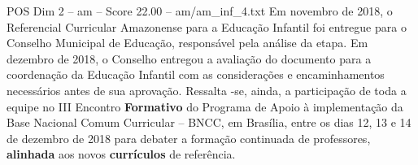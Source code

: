\begin{textsample}{POS Dim 2 – am – Score 22.00 – am/am\_inf\_4.txt}
Em novembro de 2018, o Referencial Curricular Amazonense para a Educação Infantil foi entregue para o Conselho Municipal de Educação, responsável pela análise da etapa.
Em dezembro de 2018, o Conselho entregou a avaliação do documento para a coordenação da Educação Infantil com as considerações e encaminhamentos necessários antes de sua aprovação.
Ressalta -se, ainda, a participação de toda a equipe no III Encontro \textbf{Formativo} do Programa de Apoio à implementação da Base Nacional Comum Curricular – BNCC, em Brasília, entre os dias 12, 13 e 14 de dezembro de 2018 para debater a formação continuada de professores, \textbf{alinhada} aos novos \textbf{currículos} de referência.

\end{textsample}
